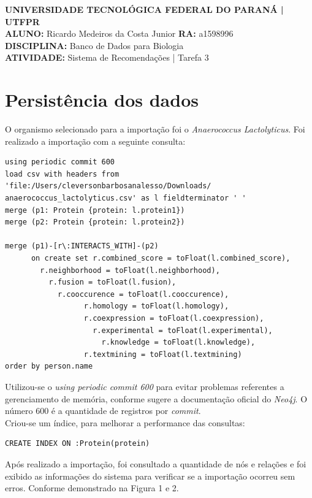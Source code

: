 \documentclass[a4paper, 12pt]{article}
\begin{document}
\lstset{language=SQL}
\textbf{UNIVERSIDADE TECNOLÓGICA FEDERAL DO PARANÁ | UTFPR} \\
\textbf{ALUNO:} Ricardo Medeiros da Costa Junior   \textbf{RA:} a1598996 \\
\textbf{DISCIPLINA:} Banco de Dados para Biologia \\
\textbf{ATIVIDADE:} Sistema de Recomendações | Tarefa 3 

\section{Persistência dos dados}
O organismo selecionado para a importação foi o \emph{Anaerococcus Lactolyticus}. Foi realizado a importação com a seguinte consulta:

\begin{lstlisting}[frame=single]
using periodic commit 600
load csv with headers from
'file:/Users/cleversonbarbosanalesso/Downloads/
anaerococcus_lactolyticus.csv' as l fieldterminator ' '
merge (p1: Protein {protein: l.protein1})
merge (p2: Protein {protein: l.protein2})

merge (p1)-[r\:INTERACTS_WITH]-(p2)
      on create set r.combined_score = toFloat(l.combined_score),
        r.neighborhood = toFloat(l.neighborhood),
          r.fusion = toFloat(l.fusion),
            r.cooccurence = toFloat(l.cooccurence),
                  r.homology = toFloat(l.homology),
                  r.coexpression = toFloat(l.coexpression),
                    r.experimental = toFloat(l.experimental),
                      r.knowledge = toFloat(l.knowledge),
                  r.textmining = toFloat(l.textmining)
order by person.name
\end{lstlisting}

Utilizou-se o \emph{using periodic commit 600} para evitar problemas referentes a gerenciamento de memória, conforme sugere a documentação oficial do \emph{Neo4j}. O número 600 é a quantidade de registros por \textit{commit}. \\

Criou-se um índice, para melhorar a performance das consultas:

\begin{lstlisting}[frame=single]
CREATE INDEX ON :Protein(protein)
\end{lstlisting}

Após realizado a importação, foi consultado a quantidade de nós e relações e foi exibido as informações do sistema para verificar se a importação ocorreu sem erros. Conforme demonstrado na Figura 1 e 2.
\end{document}
